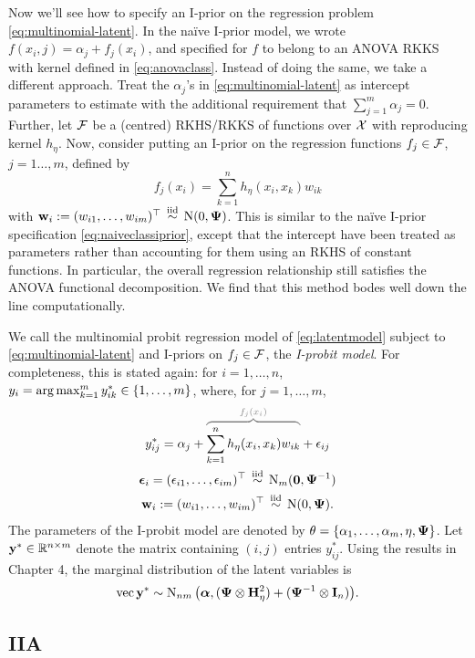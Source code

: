Now we'll see how to specify an I-prior on the regression problem \cref{eq:multinomial-latent}.
In the naïve I-prior model, we wrote $f(x_i,j) = \alpha_j + f_j(x_i)$, and specified for $f$ to belong to an ANOVA RKKS with kernel defined in \cref{eq:anovaclass}.
Instead of doing the same, we take a different approach.
Treat the $\alpha_j$'s in \cref{eq:multinomial-latent} as intercept parameters to estimate with the additional requirement that $\sum_{j=1}^m \alpha_j = 0$.
Further, let ${\mathcal F}$ be a (centred) RKHS/RKKS of functions over ${\mathcal X}$ with reproducing kernel $h_\eta$.
Now, consider putting an I-prior on the regression functions $f_j \in {\mathcal F}$, $j=1\dots,m$, defined by
\[
  f_j(x_i) = \sum_{k=1}^n h_\eta(x_i,x_k)w_{ik}
\]
with ${\mathbf w}_i := (w_{i1},\dots,w_{im})^\top \,\overset{\text{iid}}{\sim}\, \operatorname{N}(0,{\bm\Psi})$.
This is similar to the naïve I-prior specification \cref{eq:naiveclassiprior}, except that the intercept  have been treated as parameters rather than accounting for them using an RKHS of constant functions.
In particular, the overall regression relationship still satisfies the ANOVA functional decomposition.
We find that this method bodes well down the line computationally.

We call the multinomial probit regression model of \cref{eq:latentmodel} subject to \cref{eq:multinomial-latent} and I-priors on $f_j \in {\mathcal F}$, the \emph{I-probit model}.
For completeness, this is stated again: for $i=1,\dots,n$, $y_i = \operatorname*{arg\,max}_{k=1}^m y_{ik}^* \in \{1,\dots,m\}$, where, for $j=1,\dots,m$,
\begin{align}
  \begin{gathered}
    y_{ij}^* = \alpha_j + 
    \greyoverbrace{\sum_{k=1}^n h_\eta(x_i,x_k)w_{ik}}{f_j(x_i)}
    + \epsilon_{ij} \\
    \bepsilon_{i} = (\epsilon_{i1}, \dots, \epsilon_{im})^\top  \iid \N_m(\bzero, \bPsi^{-1}) \\
    \bw_i := (w_{i1},\dots,w_{im})^\top \iid \N(0,\bPsi).
  \end{gathered}
\end{align}
The parameters of the I-probit model are denoted by $\theta = \{\alpha_1,\dots,\alpha_m,\eta,{\bm\Psi} \}$.
Let ${\mathbf y}^* \in \mathbb{R}^{n \times m}$ denote the matrix containing $(i,j)$ entries $y_{ij}^*$.
Using the results in Chapter 4, the marginal distribution of the latent variables is
\[
  \operatorname{vec} {\mathbf y}^* \sim \operatorname{N}_{nm}\big({\bm\alpha}, ({\bm\Psi} \otimes {\mathbf H}_\eta^2) + ({\bm\Psi}^{-1} \otimes {\mathbf I}_n)\big).
\]

\subsection{IIA}

